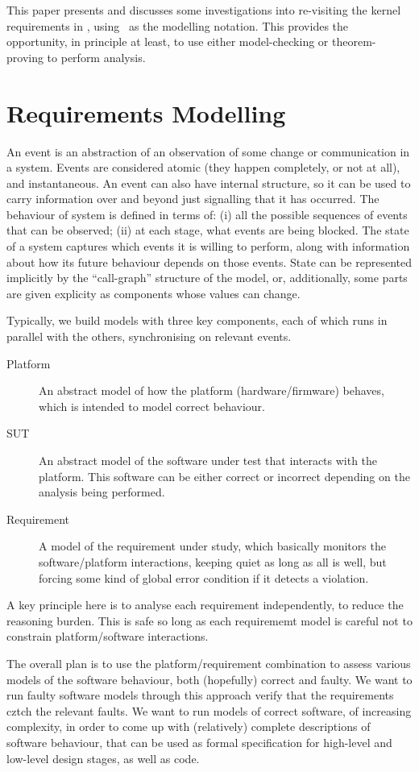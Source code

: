 This paper presents and discusses some investigations
into re-visiting the kernel requirements in \cite{IMAKQP-D02},
using \Circus\ as the modelling notation.
This provides the opportunity, in principle at least,
to use either model-checking or theorem-proving to perform analysis.

\section{Requirements Modelling}

An event is an abstraction of an observation of some change
or communication in a system. Events are considered atomic
(they happen completely, or not at all), and instantaneous.
An event can also have internal structure,
so it can be used to carry information over and beyond
just signalling that it has occurred.
The behaviour of system is defined in terms of:
(i) all the possible sequences of events that can be observed;
(ii) at each stage, what events are being blocked.
The state of a system captures which events it is willing to perform,
along with information about how its future behaviour depends on those events.
State can be represented implicitly by the ``call-graph'' structure of the model,
or, additionally,
some parts are given explicity as components whose values can change.

Typically, we build models with three key components,
each of which runs in parallel with the others,
synchronising on relevant events.
\begin{description}
  \item [Platform]
    An abstract model of how the platform (hardware/firmware) behaves,
    which is intended to model correct behaviour.
  \item [SUT]
   An abstract model of the software under test that interacts
   with the platform.
   This software can be either correct or incorrect depending on
   the analysis being performed.
  \item [Requirement]
   A model of the requirement under study, which basically monitors
   the software/platform interactions, keeping quiet as long as all is well,
   but forcing some kind of global error condition if it detects a violation.
\end{description}
A key principle here is to analyse each requirement independently,
to reduce the reasoning burden.
This is safe so long as each requirememt model is careful not
to constrain platform/software interactions.

The overall plan is to use the platform/requirement combination
to assess various models of the software behaviour,
both (hopefully) correct and faulty.
We want to run faulty software models through this approach verify that
the requirements cztch the relevant faults.
We want to run models of correct software, of increasing complexity,
in order to come up with (relatively) complete descriptions
of software behaviour, that can be used as formal specification
for high-level and low-level design stages, as well as code.


